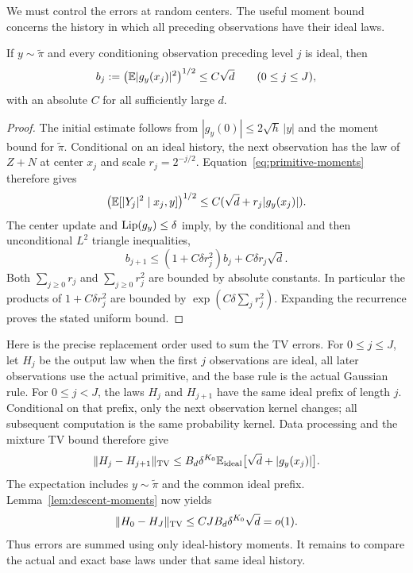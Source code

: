 We must control the errors at random centers. The useful moment
bound concerns the history in which all preceding observations
have their ideal laws.

\begin{lemma}
\label{lem:descent-moments}
If $y\sim\widetilde\pi$ and every conditioning observation preceding
level $j$ is ideal, then
\[
 b_j:=\left(\mathbb E|g_y(x_j)|^2\right)^{1/2}\le C\sqrt d
             \qquad(0\le j\le J),
\]
with an absolute $C$ for all sufficiently large $d$.
\end{lemma}
\begin{proof}
The initial estimate follows from
$|g_y(0)|\le2\sqrt h\,|y|$ and the moment bound for
$\widetilde\pi$. Conditional on an ideal history, the next
observation has the law of $Z+N$ at center $x_j$ and scale
$r_j=2^{-j/2}$. Equation~\eqref{eq:primitive-moments} therefore gives
\[
 \left(\mathbb E[|Y_j|^2\mid x_j,y]\right)^{1/2}
          \le C(\sqrt d+r_j|g_y(x_j)|).
\]
The center update and $\operatorname{Lip}(g_y)\le\delta$ imply, by the
conditional and then unconditional $L^2$ triangle inequalities,
\[
 b_{j+1}\le(1+C\delta r_j^2)b_j+C\delta r_j\sqrt d.
\]
Both $\sum_{j\ge0}r_j$ and $\sum_{j\ge0}r_j^2$ are bounded
by absolute constants. In particular the products of
$1+C\delta r_j^2$ are bounded by
$\exp(C\delta\sum_jr_j^2)$. Expanding the recurrence proves
the stated uniform bound.
\end{proof}

Here is the precise replacement order used to sum the TV errors.
For $0\le j\le J$, let $H_j$ be the output law when the first
$j$ observations are ideal, all later observations use the actual
primitive, and the base rule is the actual Gaussian rule.
For $0\le j<J$, the laws $H_j$ and $H_{j+1}$ have the same ideal prefix of length
$j$. Conditional on that prefix, only the next observation kernel
changes; all subsequent computation is the same probability kernel.
Data processing and the mixture TV bound therefore give
\[
 \lVert H_j-H_{j+1}\rVert_{\mathrm{TV}}
    \le B_d\delta^{K_0}\mathbb E_{\rm ideal}
                        \bigl[\sqrt d+|g_y(x_j)|\bigr].
\]
The expectation includes $y\sim\widetilde\pi$ and the common
ideal prefix. Lemma~\ref{lem:descent-moments} now yields
\begin{equation}\label{eq:descent-tv}
 \lVert H_0-H_J\rVert_{\mathrm{TV}}
       \le CJ B_d\delta^{K_0}\sqrt d=o(1).
\end{equation}
Thus errors are summed using only ideal-history moments. It remains
to compare the actual and exact base laws under that same ideal history.

